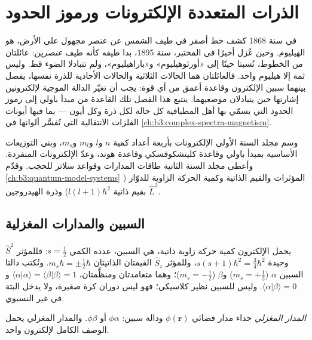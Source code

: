 \chapter{الذرات المتعددة الإلكترونات ورموز الحدود}\label{ch:b3:many-electron-atoms}

في سنة 1868 كشف خط أصفر في طيف الشمس عن عنصر
مجهول على الأرض، هو الهيليوم. وحين عُزل أخيرًا في المختبر، سنة
1895، بدا طيفه كأنه طيف \emph{عنصرين}: عائلتان من
الخطوط، نُسبتا حينًا إلى «أورثوهيليوم»
و«باراهيليوم»، ولم تتبادلا الضوء قط. وليس
ثمة إلا هيليوم واحد. فالعائلتان هما الحالات الثلاثية والحالات الأحادية للذرة
نفسها، يفصل بينهما سبين الإلكترون وقاعدة أعمق
من أي قوة: يجب أن تغيّر الدالة الموجية لإلكترونين إشارتها حين
يتبادلان موضعيهما. يتتبع هذا الفصل تلك القاعدة من مبدأ باولي إلى
رموز الحدود التي يسمّي بها أهل المطيافية كل حالة لكل ذرة
وكل أيون --- بما فيها أيونات الفلزات الانتقالية التي تُفسَّر ألوانها
في \cref{ch:b3:complex-spectra-magnetism}.

\begin{recall}
وسم مجلد السنة الأولى الإلكترونات بأربعة أعداد كمية $n$ و$l$
و$m_l$ و$m_s$، وبنى التوزيعات الأساسية بمبدأ باولي 
وقاعدة كليتشكوفسكي وقاعدة هوند، وعدّ الإلكترونات المنفردة. وأعطى مجلد السنة الثانية
طاقات المدارات وقواعد سلاتر للحجب.
وقدّم \cref{ch:b3:quantum-model-systems} المؤثرات والقيم الذاتية وكمية
الحركة الزاوية للدوّار ($\hat L^2$ بقيم ذاتية $l(l+1)\hbar^2$) 
وذرة الهيدروجين.
\end{recall}

\section{السبين والمدارات المغزلية}

يحمل الإلكترون كمية حركة زاوية ذاتية، هي السبين، عدده
الكمي $s = \frac12$: فللمؤثر $\hat S^2$  وحيدة $s(s+1)\hbar^2 =
\frac34\hbar^2$، وللمؤثر $\hat S_z$ القيمتان الذاتيتان $m_s\hbar = \pm\frac12\hbar$.
وتُكتب دالتا السبين $\alpha$ ($m_s = +\frac12$) و$\beta$
($m_s = -\frac12$)؛ وهما متعامدتان ومنظَّمتان، $\langle\alpha|\alpha\rangle =
\langle\beta|\beta\rangle = 1$ و$\langle\alpha|\beta\rangle = 0$. وليس للسبين
نظير كلاسيكي؛ فهو ليس دوران كرة صغيرة، ولا
يدخل البتة في  غير النسبوي.

\begin{definition}\label{def:b3:many-electron-atoms:spin-orbital}
\emph{المدار المغزلي} جداء مدار فضائي
$\phi(\mathbf r)$ ودالة سبين: $\phi\alpha$ أو $\phi\beta$. 
والمدار المغزلي يحمل الوصف الكامل لإلكترون واحد.
\end{definition}


